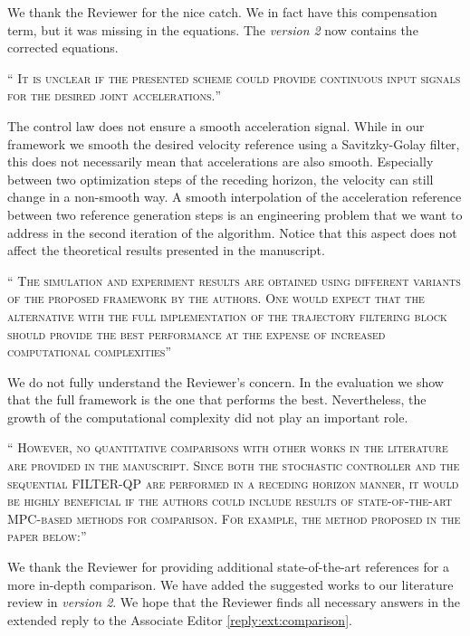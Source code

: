 \documentclass[10pt]{article}
\newcommand{\referee}[1]{\;
  \begin{minipage}[t]{.95\textwidth}
    ``{\small\color{red} \textsc{#1}}''
  \end{minipage}\medskip
  }
\newcommand{\version}[1]{\textit{version #1}}
\begin{document}
\begin{enumerate}[label={[R3:\,\arabic{enumi}]}]
We thank the Reviewer for the nice catch. We in fact have this compensation term, but it was missing in the equations. The \version{2} now contains the corrected equations.

\item\label{reply:R3:6} 
\referee{It is unclear if the presented scheme could provide continuous input signals for the desired joint accelerations.}

The control law does not ensure a smooth acceleration signal. While in our framework we smooth the desired velocity reference using a Savitzky-Golay filter, this does not necessarily mean that accelerations are also smooth. Especially between two optimization steps of the receding horizon, the velocity can still change in a non-smooth way. A smooth interpolation of the acceleration reference between two reference generation steps is an engineering problem that we want to address in the second iteration of the algorithm. Notice that this aspect does not affect the theoretical results presented in the manuscript. 

\item\label{reply:R3:7} 
\referee{The simulation and experiment results are obtained using different variants of the proposed framework by the authors. One would expect that the alternative with the full implementation of the trajectory filtering block should provide the best performance at the expense of increased computational complexities}

We do not fully understand the Reviewer’s concern. In the evaluation we show that the full framework is the one that performs the best. Nevertheless, the growth of the computational complexity did not play an important role.

\item\label{reply:R3:8} 
\referee{However, no quantitative comparisons with other works in the literature are provided in the manuscript. Since both the stochastic controller and the sequential FILTER-QP are performed in a receding horizon manner, it would be highly beneficial if the authors could include results of state-of-the-art MPC-based methods for comparison. For example, the method proposed in the paper below:}

We thank the Reviewer for providing additional state-of-the-art references for a more in-depth comparison. We have added the suggested works to our literature review in \version{2}. We hope that the Reviewer finds all necessary answers in the extended reply to the Associate Editor \ref{reply:ext:comparison}.


\end{enumerate}
\end{document}
